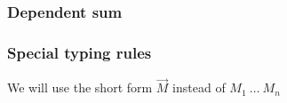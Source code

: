 \documentclass[a4paper]{article}
\begin{document}
\subsubsection{Dependent sum}

\begin{minipage}{0.8\textwidth}
  \begin{flushleft}
    \begin{prooftree}
    \end{prooftree}

    \begin{prooftree}
    \end{prooftree}
  \end{flushleft}
\end{minipage}
\begin{minipage}{0.2\textwidth}
  \begin{flushright}
    \begin{prooftree}
    \end{prooftree}

    \begin{prooftree}
    \end{prooftree}
  \end{flushright}
\end{minipage}

\subsubsection{Special typing rules}

\begin{prooftree}
\end{prooftree}

We will use the short form $\vec{M}$ instead of $M_1 \: \dots \: M_n$
\end{document}
